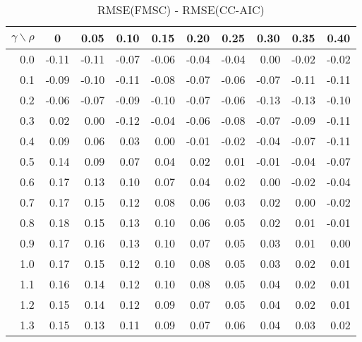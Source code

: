 \documentclass[12pt]{article}
\begin{document}
\begin{table}[!tbp]
\caption{RMSE(FMSC) - RMSE(CC-AIC)}
 \begin{center}
 \begin{tabular}{r|rrrrrrrrr}\hline\hline
\multicolumn{1}{c|}{$\gamma\backslash\rho$}&\multicolumn{1}{c}{0}&\multicolumn{1}{c}{0.05}&\multicolumn{1}{c}{0.10}&\multicolumn{1}{c}{0.15}&\multicolumn{1}{c}{0.20}&\multicolumn{1}{c}{0.25}&\multicolumn{1}{c}{0.30}&\multicolumn{1}{c}{0.35}&\multicolumn{1}{c}{0.40}\tabularnewline
\hline

0.0&-0.11&-0.11&-0.07&-0.06&-0.04&-0.04& 0.00&-0.02&-0.02\tabularnewline
0.1&-0.09&-0.10&-0.11&-0.08&-0.07&-0.06&-0.07&-0.11&-0.11\tabularnewline
0.2&-0.06&-0.07&-0.09&-0.10&-0.07&-0.06&-0.13&-0.13&-0.10\tabularnewline
0.3& 0.02& 0.00&-0.12&-0.04&-0.06&-0.08&-0.07&-0.09&-0.11\tabularnewline
0.4& 0.09& 0.06& 0.03& 0.00&-0.01&-0.02&-0.04&-0.07&-0.11\tabularnewline
0.5& 0.14& 0.09& 0.07& 0.04& 0.02& 0.01&-0.01&-0.04&-0.07\tabularnewline
0.6& 0.17& 0.13& 0.10& 0.07& 0.04& 0.02& 0.00&-0.02&-0.04\tabularnewline
0.7& 0.17& 0.15& 0.12& 0.08& 0.06& 0.03& 0.02& 0.00&-0.02\tabularnewline
0.8& 0.18& 0.15& 0.13& 0.10& 0.06& 0.05& 0.02& 0.01&-0.01\tabularnewline
0.9& 0.17& 0.16& 0.13& 0.10& 0.07& 0.05& 0.03& 0.01& 0.00\tabularnewline
1.0& 0.17& 0.15& 0.12& 0.10& 0.08& 0.05& 0.03& 0.02& 0.01\tabularnewline
1.1& 0.16& 0.14& 0.12& 0.10& 0.08& 0.05& 0.04& 0.02& 0.01\tabularnewline
1.2& 0.15& 0.14& 0.12& 0.09& 0.07& 0.05& 0.04& 0.02& 0.01\tabularnewline
1.3& 0.15& 0.13& 0.11& 0.09& 0.07& 0.06& 0.04& 0.03& 0.02\tabularnewline
\hline
\end{tabular}

\end{center}

\end{table}

%
\end{document}
